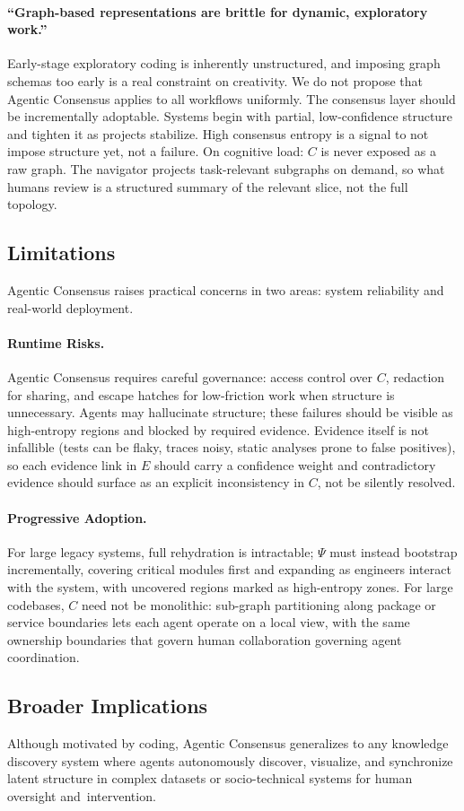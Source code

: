 \paragraph{``Graph-based representations are brittle for dynamic, exploratory work.''}
Early-stage exploratory coding is inherently unstructured, and imposing graph schemas too early is a real constraint on creativity. We do not propose that Agentic Consensus applies to all workflows uniformly.
The consensus layer should be incrementally adoptable. Systems begin with partial, low-confidence structure and tighten it as projects stabilize.
High consensus entropy is a signal to not impose structure yet, not a failure.
On cognitive load: $C$ is never exposed as a raw graph. The navigator projects task-relevant subgraphs on demand, so what humans review is a structured summary of the relevant slice, not the full topology.

\subsection{Limitations}
Agentic Consensus raises practical concerns in two areas: system reliability and real-world deployment.

\paragraph{Runtime Risks.}
Agentic Consensus requires careful governance: access control over $C$, redaction for sharing, and escape hatches for low-friction work when structure is unnecessary.
Agents may hallucinate structure; these failures should be visible as high-entropy regions and blocked by required evidence. Evidence itself is not infallible (tests can be flaky, traces noisy, static analyses prone to false positives), so each evidence link in $E$ should carry a confidence weight and contradictory evidence should surface as an explicit inconsistency in $C$, not be silently resolved.

\paragraph{Progressive Adoption.}
For large legacy systems, full rehydration is intractable; $\Psi$ must instead bootstrap incrementally, covering critical modules first and expanding as engineers interact with the system, with uncovered regions marked as high-entropy zones.
For large codebases, $C$ need not be monolithic: sub-graph partitioning along package or service boundaries lets each agent operate on a local view, with the same ownership boundaries that govern human collaboration governing agent coordination.

\subsection{Broader Implications}
Although motivated by coding, Agentic Consensus generalizes to any knowledge discovery system where agents autonomously discover, visualize, and synchronize latent structure in complex datasets or socio-technical systems for human oversight and~intervention.
